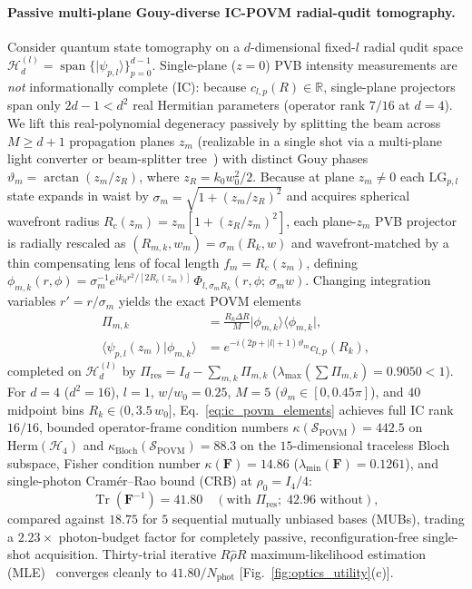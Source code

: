 \documentclass[aps,pra,onecolumn,notitlepage,11pt,tightenlines,amsmath,amssymb,floatfix,longbibliography]{revtex4-2}
\providecommand{\bra}[1]{\langle#1\rvert}
\providecommand{\ket}[1]{\lvert#1\rangle}
\providecommand{\braket}[2]{\langle#1\vert#2\rangle}
\providecommand{\abs}[1]{\lvert#1\rvert}
\begin{document}
\paragraph*{Passive multi-plane Gouy-diverse IC-POVM radial-qudit tomography.}
Consider quantum state tomography on a $d$-dimensional fixed-$l$ radial qudit space $\mathcal{H}_d^{(l)} = \operatorname{span}\{\ket{\psi_{p,l}}\}_{p=0}^{d-1}$. Single-plane ($z = 0$) PVB intensity measurements are \emph{not} informationally complete (IC): because $c_{l,p}(R) \in \mathbb{R}$, single-plane projectors span only $2d - 1 < d^2$ real Hermitian parameters (operator rank $7/16$ at $d = 4$). We lift this real-polynomial degeneracy passively by splitting the beam across $M \ge d+1$ propagation planes $z_m$ (realizable in a single shot via a multi-plane light converter or beam-splitter tree~\cite{Fontaine2019,Bouchard2018}) with distinct Gouy phases $\vartheta_m = \arctan(z_m/z_R)$, where $z_R = k_0 w_0^2/2$. Because at plane $z_m \neq 0$ each $\mathrm{LG}_{p,l}$ state expands in waist by $\sigma_m = \sqrt{1 + (z_m/z_R)^2}$ and acquires spherical wavefront radius $R_c(z_m) = z_m[1 + (z_R/z_m)^2]$, each plane-$z_m$ PVB projector is radially rescaled as $(R_{m,k}, w_m) = \sigma_m(R_k, w)$ and wavefront-matched by a thin compensating lens of focal length $f_m = R_c(z_m)$, defining $\phi_{m,k}(r,\phi) = \sigma_m^{-1} e^{ik_0 r^2/[2R_c(z_m)]}\,\Phi_{l,\sigma_m R_k}(r,\phi;\,\sigma_m w)$. Changing integration variables $r' = r/\sigma_m$ yields the exact POVM elements~\cite{Renes2004}
\begin{align}
\Pi_{m,k} &= \frac{R_k \Delta R}{M}\ket{\phi_{m,k}}\bra{\phi_{m,k}}, \nonumber \\
\braket{\psi_{p,l}(z_m)}{\phi_{m,k}} &= e^{-i(2p+\abs{l}+1)\vartheta_m} c_{l,p}(R_k),
\label{eq:ic_povm_elements}
\end{align}
completed on $\mathcal{H}_d^{(l)}$ by $\Pi_{\mathrm{res}} = I_d - \sum_{m,k}\Pi_{m,k}$ ($\lambda_{\max}(\sum \Pi_{m,k}) = 0.9050 < 1$). For $d = 4$ ($d^2 = 16$), $l = 1$, $w/w_0 = 0.25$, $M = 5$ ($\vartheta_m \in [0, 0.45\pi]$), and $40$ midpoint bins $R_k \in (0, 3.5\,w_0]$, Eq.~\eqref{eq:ic_povm_elements} achieves full IC rank $16/16$, bounded operator-frame condition numbers $\kappa(\mathcal{S}_{\mathrm{POVM}}) = 442.5$ on $\mathrm{Herm}(\mathcal{H}_4)$ and $\kappa_{\mathrm{Bloch}}(\mathcal{S}_{\mathrm{POVM}}) = 88.3$ on the $15$-dimensional traceless Bloch subspace, Fisher condition number $\kappa(\mathbf{F}) = 14.86$ ($\lambda_{\min}(\mathbf{F}) = 0.1261$), and single-photon Cram\'er--Rao bound (CRB) at $\rho_0 = I_4/4$:
\begin{equation}
\operatorname{Tr}\!\left(\mathbf{F}^{-1}\right) = 41.80 \quad (\text{with }\Pi_{\mathrm{res}};\; 42.96\text{ without}),
\label{eq:fisher_crb}
\end{equation}
compared against $18.75$ for $5$ sequential mutually unbiased bases (MUBs), trading a $2.23\times$ photon-budget factor for completely passive, reconfiguration-free single-shot acquisition. Thirty-trial iterative $R\hat{\rho}R$ maximum-likelihood estimation (MLE)~\cite{Lvovsky2004} converges cleanly to $41.80/N_{\mathrm{phot}}$ [Fig.~\ref{fig:optics_utility}(c)].
\end{document}
